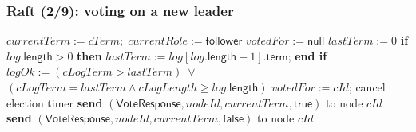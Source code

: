 \begin{frame}
    \label{s:raft2}
    \frametitle{Raft (2/9): voting on a new leader}
    \footnotesize
    \begin{algorithmic}
        \State
                \State $\mathit{currentTerm} := \mathit{cTerm};\; \mathit{currentRole} := \mathsf{follower}$
                \State $\mathit{votedFor} := \mathsf{null}$
            \EndIf
            \State $\mathit{lastTerm} := 0$
            \State \textbf{if} $\mathit{log}.\mathsf{length} > 0$ \textbf{then} $\mathit{lastTerm} := \mathit{log}[\mathit{log}.\mathsf{length} - 1].\mathsf{term}$; \textbf{end if}
            \State $\mathit{logOk} := (\mathit{cLogTerm} > \mathit{lastTerm}) \;\vee$
            \State \hspace{25pt}$(\mathit{cLogTerm} = \mathit{lastTerm} \wedge \mathit{cLogLength} \ge \mathit{log}.\mathsf{length})$
            \State
                \State $\mathit{votedFor} := \mathit{cId}$; cancel election timer
                \State \textbf{send} $(\mathsf{VoteResponse}, \mathit{nodeId}, \mathit{currentTerm}, \mathsf{true})$ to node $\mathit{cId}$
            \Else
                \State \textbf{send} $(\mathsf{VoteResponse}, \mathit{nodeId}, \mathit{currentTerm}, \mathsf{false})$ to node $\mathit{cId}$
            \EndIf
        \EndOn
        \State
    \end{algorithmic}
\end{frame}
\label{l:raft2}

